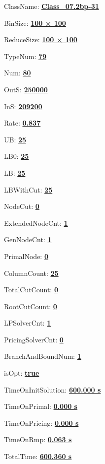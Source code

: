 \documentclass[11pt]{article}
\begin{document}
\pagestyle{empty}


ClassName: \underline{\textbf{Class_07.2bp-31}}
\par
BinSize: \underline{\textbf{100 × 100}}
\par
ReduceSize: \underline{\textbf{100 × 100}}
\par
TypeNum: \underline{\textbf{79}}
\par
Num: \underline{\textbf{80}}
\par
OutS: \underline{\textbf{250000}}
\par
InS: \underline{\textbf{209200}}
\par
Rate: \underline{\textbf{0.837}}
\par
UB: \underline{\textbf{25}}
\par
LB0: \underline{\textbf{25}}
\par
LB: \underline{\textbf{25}}
\par
LBWithCut: \underline{\textbf{25}}
\par
NodeCut: \underline{\textbf{0}}
\par
ExtendedNodeCnt: \underline{\textbf{1}}
\par
GenNodeCnt: \underline{\textbf{1}}
\par
PrimalNode: \underline{\textbf{0}}
\par
ColumnCount: \underline{\textbf{25}}
\par
TotalCutCount: \underline{\textbf{0}}
\par
RootCutCount: \underline{\textbf{0}}
\par
LPSolverCnt: \underline{\textbf{1}}
\par
PricingSolverCnt: \underline{\textbf{0}}
\par
BranchAndBoundNum: \underline{\textbf{1}}
\par
isOpt: \underline{\textbf{true}}
\par
TimeOnInitSolution: \underline{\textbf{600.000 s}}
\par
TimeOnPrimal: \underline{\textbf{0.000 s}}
\par
TimeOnPricing: \underline{\textbf{0.000 s}}
\par
TimeOnRmp: \underline{\textbf{0.063 s}}
\par
TotalTime: \underline{\textbf{600.360 s}}
\par
\newpage


\end{document}
